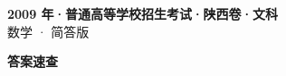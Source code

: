 \documentclass[zihao=-4, a4paper]{ctexart}
\begin{document}
\begin{center}
  {\Large\bfseries 2009 年·普通高等学校招生考试·陕西卷·文科}\\[4pt]
  {\large 数学 · 简答版}
\end{center}
\medskip
{}

\clearpage
{}
\begin{center}{\Large\bfseries 答案速查}\end{center}
\medskip

\end{document}
